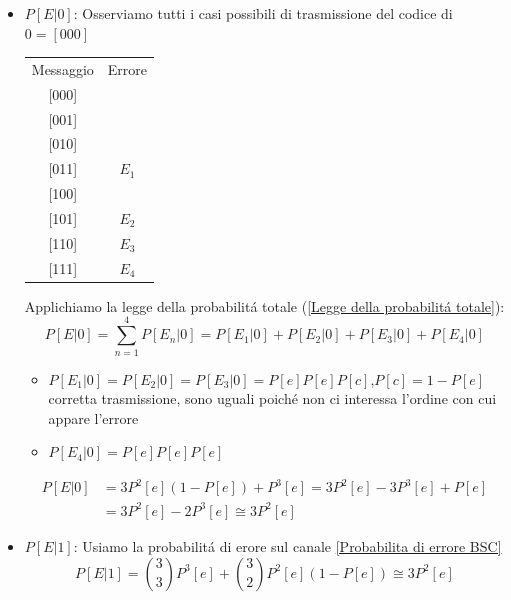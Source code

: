                 \begin{itemize}
                    \item {$P[E|0]$: Osserviamo tutti i casi possibili di trasmissione del codice di $0 = [000]$
                        \begin{table}[H]
                            \centering
                            \begin{tabular}{cc}
                            Messaggio & Errore \\
                            {[}000{]} &    \\
                            {[}001{]} &    \\
                            {[}010{]} &    \\
                            {[}011{]} &    $E_1$\\
                            {[}100{]} &    \\
                            {[}101{]} &    $E_2$\\
                            {[}110{]} &    $E_3$\\
                            {[}111{]} &    $E_4$
                            \end{tabular}
                        \end{table}
                        Applichiamo la legge della probabilitá totale (\ref{Legge della probabilitá totale}):
                        \[
                            P[E|0] = \sum_{n=1}^{4}P[E_n|0] = P[E_1|0] +P[E_2|0]+P[E_3|0]+P[E_4|0] 
                        \]
                        \begin{itemize}
                            \item {$P[E_1|0] = P[E_2|0] = P[E_3|0] = P[e]P[e]P[c]$,$P[c] = 1-P[e]$ corretta trasmissione, sono uguali poiché non ci interessa l'ordine con cui appare l'errore}
                            \item {$P[E_4|0] = P[e]P[e]P[e]$}
                        \end{itemize}
                        \begin{align}
                            P[E|0] &= 3P^2[e](1-P[e])+ P^3[e] = 3P^2[e]-3P^3[e]+P[e] \nonumber \\
                                   &= 3P^2[e] -2P^3[e] \cong 3P^2[e]\nonumber
                        \end{align}
                    }
                    \item {$P[E|1]$: Usiamo la probabilitá di erore sul canale \ref{Probabilita di errore BSC}
                        \[
                            P[E|1] = \binom{3}{3}P^3[e] +\binom{3}{2}P^2[e] (1-P[e]) \cong 3 P^2[e]
                        \]
                    }
                \end{itemize}         
